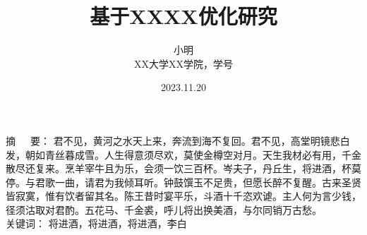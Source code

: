 \documentclass[a4paper, UTF8]{ctexart}
\begin{document}
	
	\setlength{\columnwidth}{17.6cm}
	
	\title{基于XXXX优化研究}
	
	\author{小明\\ XX大学XX学院，学号}
	\date{2023.11.20}
	
	\maketitle
	\begin{center}  
		\parbox{\textwidth}{  {\heiti 摘~~~要：} {\kaishu 君不见，黄河之水天上来，奔流到海不复回。君不见，高堂明镜悲白发，朝如青丝暮成雪。人生得意须尽欢，莫使金樽空对月。天生我材必有用，千金散尽还复来。烹羊宰牛且为乐，会须一饮三百杯。岑夫子，丹丘生，将进酒，杯莫停。与君歌一曲，请君为我倾耳听。钟鼓馔玉不足贵，但愿长醉不复醒。古来圣贤皆寂寞，惟有饮者留其名。陈王昔时宴平乐，斗酒十千恣欢谑。主人何为言少钱，径须沽取对君酌。五花马、千金裘，呼儿将出换美酒，与尔同销万古愁。}\\  {\heiti 关键词：} {\kaishu 将进酒，将进酒，将进酒，李白}\\}  
	\end{center}
	\maketitle

	\cite{1}
			
	
\end{document}

